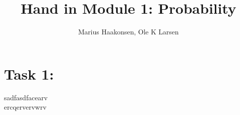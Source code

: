 \documentclass[11pt]{amsart}
\title{Hand in Module 1: Probability}
\author{Marius Haakonsen, Ole K Larsen}
\begin{document}
\maketitle

\section{Task 1:}

sadfasdfacearv \\
ercqervervwrv \\
\end{document}
